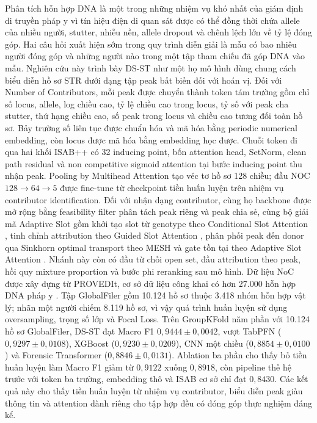 \documentclass[12pt,a4paper]{article}
\begin{document}
Phân tích hỗn hợp DNA là một trong những nhiệm vụ khó nhất của giám định di truyền pháp y vì tín hiệu điện di quan sát được có thể đồng thời chứa allele của nhiều người, stutter, nhiễu nền, allele dropout và chênh lệch lớn về tỷ lệ đóng góp. Hai câu hỏi xuất hiện sớm trong quy trình diễn giải là mẫu có bao nhiêu người đóng góp và những người nào trong một tập tham chiếu đã góp DNA vào mẫu. Nghiên cứu này trình bày DS-ST như một họ mô hình dùng chung cách biểu diễn hồ sơ STR dưới dạng tập peak bất biến đối với hoán vị. Đối với Number of Contributors, mỗi peak được chuyển thành token tám trường gồm chỉ số locus, allele, log chiều cao, tỷ lệ chiều cao trong locus, tỷ số với peak cha stutter, thứ hạng chiều cao, số peak trong locus và chiều cao tương đối toàn hồ sơ. Bảy trường số liên tục được chuẩn hóa và mã hóa bằng periodic numerical embedding, còn locus được mã hóa bằng embedding học được. Chuỗi token đi qua hai khối ISAB++ có 32 inducing point, bốn attention head, SetNorm, clean path residual và non competitive sigmoid attention tại bước inducing point thu nhận peak. Pooling by Multihead Attention tạo véc tơ hồ sơ 128 chiều; đầu NOC $128\!\to\!64\!\to\!5$ được fine-tune từ checkpoint tiền huấn luyện trên nhiệm vụ contributor identification. Đối với nhận dạng contributor, cùng họ backbone được mở rộng bằng feasibility filter phân tách peak riêng và peak chia sẻ, cùng bộ giải mã Adaptive Slot gồm khởi tạo slot từ genotype theo Conditional Slot Attention \cite{ma2024cosa}, tinh chỉnh attribution theo Guided Slot Attention \cite{lee2024gsa}, phân phối peak đến donor qua Sinkhorn optimal transport theo MESH \cite{zhang2023mesh} và gate tồn tại theo Adaptive Slot Attention \cite{fan2024adaslot}. Nhánh này còn có đầu từ chối open set, đầu attribution theo peak, hồi quy mixture proportion và bước phi reranking sau mô hình. Dữ liệu NoC được xây dựng từ PROVEDIt, cơ sở dữ liệu công khai có hơn 27.000 hỗn hợp DNA pháp y \cite{provedit2018,proveditweb}. Tập GlobalFiler gồm 10.124 hồ sơ thuộc 3.418 nhóm hỗn hợp vật lý; nhãn một người chiếm 8.119 hồ sơ, vì vậy quá trình huấn luyện sử dụng oversampling, trọng số lớp và Focal Loss. Trên GroupKFold năm phần với 10.124 hồ sơ GlobalFiler, DS-ST đạt Macro F1 $0{,}9444\pm0{,}0042$, vượt TabPFN ($0{,}9297\pm0{,}0108$), XGBoost ($0{,}9230\pm0{,}0209$), CNN một chiều ($0{,}8854\pm0{,}0100$) và Forensic Transformer ($0{,}8846\pm0{,}0131$). Ablation ba phần cho thấy bỏ tiền huấn luyện làm Macro F1 giảm từ $0{,}9122$ xuống $0{,}8918$, còn pipeline thế hệ trước với token ba trường, embedding thô và ISAB cơ sở chỉ đạt $0{,}8430$. Các kết quả này cho thấy tiền huấn luyện từ nhiệm vụ contributor, biểu diễn peak giàu thông tin và attention dành riêng cho tập hợp đều có đóng góp thực nghiệm đáng kể.
\end{document}
